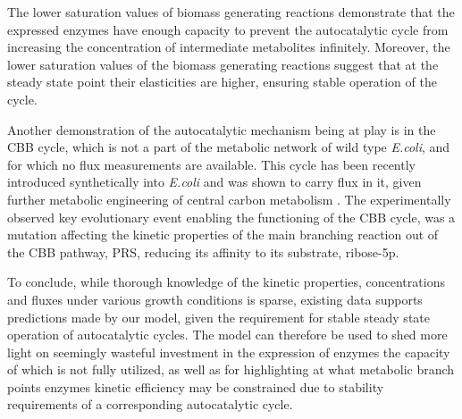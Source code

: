     The lower saturation values of biomass generating reactions demonstrate that the expressed enzymes have enough capacity to prevent the autocatalytic cycle from increasing the concentration of intermediate metabolites infinitely.
    Moreover, the lower saturation values of the biomass generating reactions suggest that at the steady state point their elasticities are higher, ensuring stable operation of the cycle.

    Another demonstration of the autocatalytic mechanism being at play is in the CBB cycle, which is not a part of the metabolic network of wild type \emph{E.coli}, and for which no flux measurements are available.
    This cycle has been recently introduced synthetically into \emph{E.coli} and was shown to carry flux in it, given further metabolic engineering of central carbon metabolism \cite{Antonovski2016}.
    The experimentally observed key evolutionary event enabling the functioning of the CBB cycle, was a mutation affecting the kinetic properties of the main branching reaction out of the CBB pathway, PRS, reducing its affinity to its substrate, ribose-5p.

    To conclude, while thorough knowledge of the kinetic properties, concentrations and fluxes under various growth conditions is sparse, existing data supports predictions made by our model, given the requirement for stable steady state operation of autocatalytic cycles.
    The model can therefore be used to shed more light on seemingly wasteful investment in the expression of enzymes the capacity of which is not fully utilized, as well as for highlighting at what metabolic branch points enzymes kinetic efficiency may be constrained due to stability requirements of a corresponding autocatalytic cycle.

